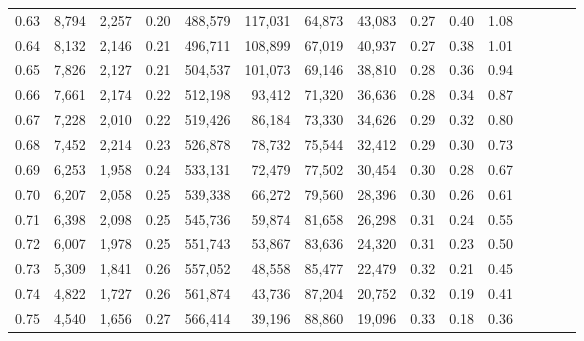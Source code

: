 \begin{tabular}{rrrcrrrrrrrrrrr}
0.63 &   8,794 &  2,257 &                                       0.20 &  488,579 &  117,031 &   64,873 &   43,083 &  0.27 &  0.40 &                         1.08 \\
0.64 &   8,132 &  2,146 &                                       0.21 &  496,711 &  108,899 &   67,019 &   40,937 &  0.27 &  0.38 &                         1.01 \\
0.65 &   7,826 &  2,127 &                                       0.21 &  504,537 &  101,073 &   69,146 &   38,810 &  0.28 &  0.36 &                         0.94 \\
0.66 &   7,661 &  2,174 &                                       0.22 &  512,198 &   93,412 &   71,320 &   36,636 &  0.28 &  0.34 &                         0.87 \\
0.67 &   7,228 &  2,010 &                                       0.22 &  519,426 &   86,184 &   73,330 &   34,626 &  0.29 &  0.32 &                         0.80 \\
0.68 &   7,452 &  2,214 &                                       0.23 &  526,878 &   78,732 &   75,544 &   32,412 &  0.29 &  0.30 &                         0.73 \\
0.69 &   6,253 &  1,958 &                                       0.24 &  533,131 &   72,479 &   77,502 &   30,454 &  0.30 &  0.28 &                         0.67 \\
0.70 &   6,207 &  2,058 &                                       0.25 &  539,338 &   66,272 &   79,560 &   28,396 &  0.30 &  0.26 &                         0.61 \\
0.71 &   6,398 &  2,098 &                                       0.25 &  545,736 &   59,874 &   81,658 &   26,298 &  0.31 &  0.24 &                         0.55 \\
0.72 &   6,007 &  1,978 &                                       0.25 &  551,743 &   53,867 &   83,636 &   24,320 &  0.31 &  0.23 &                         0.50 \\
0.73 &   5,309 &  1,841 &                                       0.26 &  557,052 &   48,558 &   85,477 &   22,479 &  0.32 &  0.21 &                         0.45 \\
0.74 &   4,822 &  1,727 &                                       0.26 &  561,874 &   43,736 &   87,204 &   20,752 &  0.32 &  0.19 &                         0.41 \\
0.75 &   4,540 &  1,656 &                                       0.27 &  566,414 &   39,196 &   88,860 &   19,096 &  0.33 &  0.18 &                         0.36 \\

\end{tabular}

